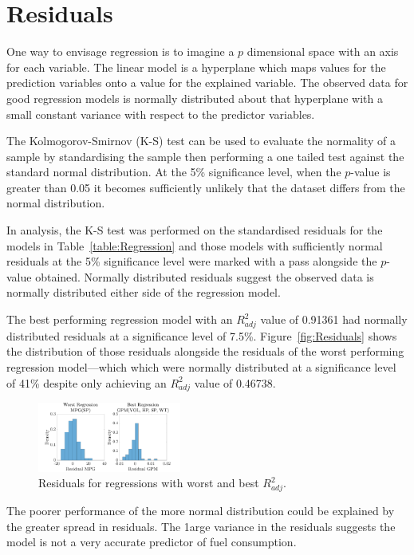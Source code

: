 \documentclass[a4paper,10pt,twocolumn]{article}
\begin{document}
\section{Residuals}

One way to envisage regression is to imagine a $p$ dimensional space with 
an axis for each variable. The linear model is a hyperplane which maps values 
for the prediction variables onto a value for the explained variable. The 
observed data for good regression models is normally distributed about that 
hyperplane with a small constant variance with respect to the predictor 
variables.

The Kolmogorov-Smirnov (K-S) test can be used to evaluate the normality of a 
sample by standardising the sample then performing a one tailed test against  
the standard normal distribution. At the 5\% significance level, when the  
$p$-value is greater than 0.05 it becomes sufficiently unlikely that the 
dataset differs from the normal distribution.

In analysis, the K-S test was performed on the standardised residuals for the 
models in Table~\vref{table:Regression} and those models with sufficiently 
normal residuals at the 5\% significance level were marked with a pass 
alongside the $p$-value obtained. Normally distributed residuals suggest the 
observed data is normally distributed either side of the regression model.

The best performing regression model with an $R_{adj}^2$ value of 0.91361 had 
normally distributed residuals at a significance level of 7.5\%. 
Figure~\vref{fig:Residuals} shows the distribution of those residuals alongside 
the residuals of the worst performing regression model---which which were 
normally distributed at a significance level of 41\% despite only achieving an 
$R_{adj}^2$ value of 0.46738.

\begin{figure}[h]
    \centering
    \includegraphics[width=0.42\textwidth]{Residuals}
    \caption{Residuals for regressions with worst and best $R_{adj}^2$.}
    \label{fig:Residuals}
\end{figure}

The poorer performance of the more normal distribution could be explained by 
the greater spread in residuals. The 1arge variance in the residuals suggests 
the model is not a very accurate predictor of fuel consumption.

\printbibliography

\clearpage

\end{document}
